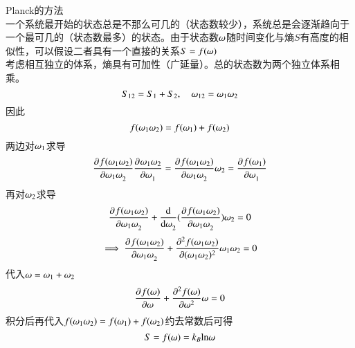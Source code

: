 \documentclass[UTF8,9pt]{ctexart}
\begin{document}
    Planck的方法\\
    一个系统最开始的状态总是不那么可几的（状态数较少），系统总是会逐渐趋向于一个最可几的（状态数最多）的状态。由于状态数$\o$随时间变化与熵$S$有高度的相似性，可以假设二者具有一个直接的关系$S=f(\o)$\\
    考虑相互独立的体系，熵具有可加性（广延量）。总的状态数为两个独立体系相乘。
    $$S_{12}=S_1+S_2,\quad \o_{12}=\o_1\o_2$$
    因此
    $$f(\o_1\o_2)=f(\o_1)+f(\o_2)$$
    两边对$\o_1$求导
    $$\pp{f(\o_1\o_2)}{\o_1\o_2}\pp{\o_1\o_2}{\o_1}=\pp{f(\o_1\o_2)}{\o_1\o_2}\o_2=\pp{f(\o_1)}{\o_1}$$
    再对$\o_2$求导
    $$\pp{f(\o_1\o_2)}{\o_1\o_2}+\dd{}{\o_2}(\pp{f(\o_1\o_2)}{\o_1\o_2})\o_2=0$$
    $$\ip \pp{f(\o_1\o_2)}{\o_1\o_2}+\pp[2]{f(\o_1\o_2)}{(\o_1\o_2)}\o_1\o_2=0$$
    代入$\o=\o_1+\o_2$
    $$\pp{f(\o)}{\o}+\pp[2]{f(\o)}{\o}\o=0$$
    积分后再代入$f(\o_1\o_2)=f(\o_1)+f(\o_2)$约去常数后可得
    $$S=f(\o)=k_B\ln \o$$
\end{document}
